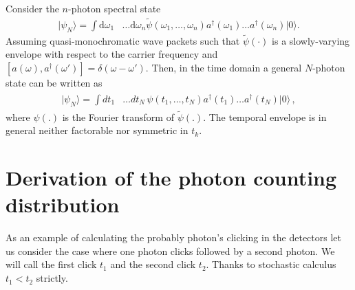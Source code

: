 \documentclass[aps,pra,twocolumn,amsmath,amssymb,color,superscriptaddress]{revtex4}
\newcommand{\ket}[1]{|#1\rangle}
\newcommand{\dg}{^\dagger}
\begin{document}
Consider the $n$-photon spectral state
\begin{align} \label{eq:nphotonfreq}
\ket{\psi_{N}} = \int\mathrm{d}\omega_1&\dots \mathrm{d}\omega_n \tilde\psi(\omega_1,\dots,\omega_n) a^\dag(\omega_1)\dots a^\dag(\omega_n)\ket{0}.  
\end{align}
Assuming quasi-monochromatic wave packets such that $\tilde\psi(\cdot)$ is a slowly-varying envelope with respect to the carrier frequency and $[a(\omega),a\dg(\omega')]= \delta(\omega - \omega')$.  Then, in the time domain a general $N$-photon state can be written as
\begin{align}\label{Eq::Genphoty}
\begin{split}
\ket{\psi_N} ={}\int dt_1 & \dots dt_N \, \psi(t_1,\dots,t_N)  a\dg(t_1)\dots a\dg(t_N) \ket{0}\,,%
\end{split}
\end{align} 
where $\psi(.)$ is the Fourier transform of $\tilde\psi(.)$.
The temporal envelope is in general neither factorable nor symmetric in $t_k$.  
 

\section{Derivation of the photon counting distribution}\label{derivation}
As an example of calculating the probably photon's clicking in the detectors let us consider the case where one photon clicks followed by a second photon. We will call the first click $t_1$ and the second click $t_2$. Thanks to stochastic calculus $t_1<t_2$ strictly.
\end{document}
